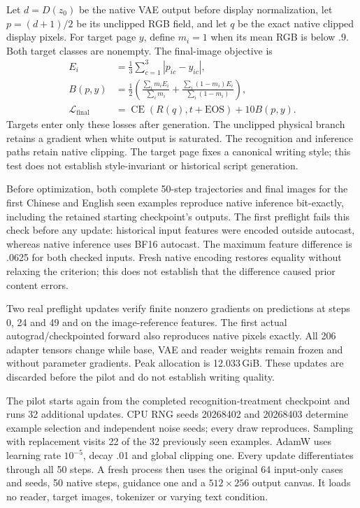 \documentclass[10pt,a4paper]{article}
\begin{document}
Let $d=D(z_0)$ be the native VAE output before display normalization, let
$p=(d+1)/2$ be its unclipped RGB field, and let $q$ be the exact native
clipped display pixels. For target page $y$, define $m_i=1$ when its mean
RGB is below .9. Both target classes are nonempty. The final-image objective is
\begin{align}
 E_i&=\tfrac13\sum_{c=1}^{3}|p_{ic}-y_{ic}|,\\
 B(p,y)&=\tfrac12\left(
       \frac{\sum_i m_iE_i}{\sum_i m_i}
       +\frac{\sum_i(1-m_i)E_i}{\sum_i(1-m_i)}\right),\\
 \mathcal L_{\mathrm{final}}&=
       \operatorname{CE}(R(q),t+\mathrm{EOS})+10B(p,y).
\end{align}
Targets enter only these losses after generation. The unclipped physical
branch retains a gradient when white output is saturated. The recognition
and inference paths retain native clipping. The target page fixes a canonical
writing style; this test does not establish style-invariant or historical
script generation.

Before optimization, both complete 50-step trajectories and final images for
the first Chinese and English seen examples reproduce native inference
bit-exactly, including the retained starting checkpoint's outputs. The first
preflight fails this check before any update: historical input features were
encoded outside autocast, whereas native inference uses BF16 autocast. The
maximum feature difference is .0625 for both checked inputs. Fresh native
encoding restores equality without relaxing the criterion; this does not
establish that the difference caused prior content errors.

Two real preflight updates verify finite nonzero gradients on predictions
at steps 0, 24 and 49 and on the image-reference features. The first actual
autograd/checkpointed forward also reproduces native pixels exactly. All
206 adapter tensors change while base, VAE and reader weights remain frozen
and without parameter gradients. Peak allocation is 12.033\,GiB. These
updates are discarded before the pilot and do not establish writing quality.

The pilot starts again from the completed recognition-treatment checkpoint
and runs 32 additional updates. CPU RNG seeds 20268402 and 20268403 determine
example selection and independent noise seeds; every draw reproduces.
Sampling with replacement visits 22 of the 32 previously seen examples.
AdamW uses learning rate $10^{-5}$, decay .01 and global clipping one.
Every update differentiates through all 50 steps. A fresh process then uses
the original 64 input-only cases and seeds, 50 native steps, guidance one
and a $512\times256$ output canvas. It loads no reader, target images,
tokenizer or varying text condition.
\end{document}
